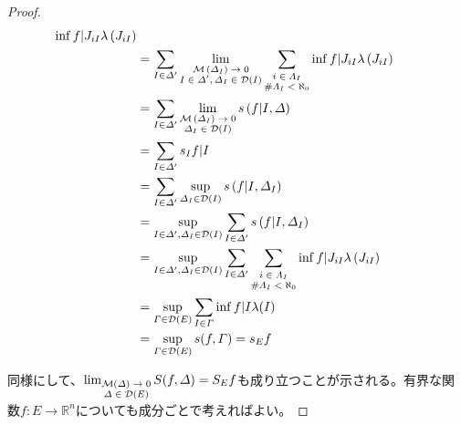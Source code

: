 \documentclass[dvipdfmx]{jsarticle}
\begin{document}
\begin{proof}
\begin{align*}
{{{\begin{matrix}
\end{matrix}} {\inf{f|J_{iI}}\lambda\left( J_{iI} \right)}}}\\
&= \sum_{I \in \varDelta' } {\lim_{\scriptsize \begin{matrix}
\mathcal{M}\left( \varDelta_{I} \right) \rightarrow 0 \\
I \in \varDelta', \varDelta_{I}\in \mathcal{D}(I) \\
\end{matrix}}{\sum_{\scriptsize \begin{matrix}
i \in \varLambda_{I} \\
\#\varLambda_{I} < \aleph_{0} \\
\end{matrix}} {\inf{f|J_{iI}}\lambda\left( J_{iI} \right)}}}\\
&= \sum_{I \in \varDelta' } {\lim_{\scriptsize \begin{matrix}
\mathcal{M}\left( \varDelta_{I} \right) \rightarrow 0 \\
\varDelta_{I}\in \mathcal{D}(I) \\
\end{matrix}}{s\left( f|I,\varDelta \right)}}\\
&= \sum_{I \in \varDelta' } {s_{I}f|I}\\
&= \sum_{I \in \varDelta' } {\sup_{\varDelta_{I}\in \mathcal{D}(I)}{s\left( f|I,\varDelta_{I} \right)}}\\
&= \sup_{I \in \varDelta', \varDelta_{I}\in \mathcal{D}(I)}{\sum_{I \in \varDelta' } {s\left( f|I,\varDelta_{I} \right)}}\\
&= \sup_{I \in \varDelta', \varDelta_{I}\in \mathcal{D}(I)}{\sum_{I \in \varDelta' } {\sum_{\scriptsize \begin{matrix}
i \in \varLambda_{I} \\
\#\varLambda_{I} < \aleph_{0} \\
\end{matrix}} {\inf{f|J_{iI}}\lambda\left( J_{iI} \right)}}}\\
&= \sup_{\varGamma \in \mathcal{D}(E)}{\sum_{I \in \varGamma } {\inf{f|I}\lambda(I)}}\\
&= \sup_{\varGamma \in \mathcal{D}(E)}{s(f,\varGamma)} = s_{E}f
\end{align*}\par
同様にして、$\lim_{\scriptsize \begin{matrix}
\mathcal{M}(\varDelta) \rightarrow 0 \\
\varDelta \in \mathcal{D}(E) \\
\end{matrix}}{S(f,\varDelta)} = S_{E}f$も成り立つことが示される。有界な関数$f:E \rightarrow \mathbb{R}^{n}$についても成分ごとで考えればよい。
\end{proof}
\end{document}

